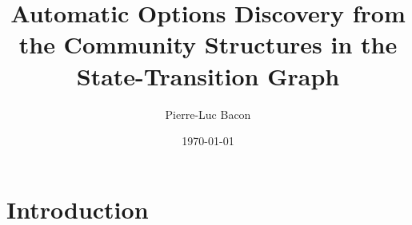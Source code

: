\documentclass[12pt, oneside, extrafontsizes]{memoir}  %
\theoremstyle{plain}
\theoremstyle{definition}
\begin{document}

\pretitle{\begin{center}\cftchapterfont\huge}
\posttitle{\end{center}}
\preauthor{\begin{center}\huge}
\postauthor{\end{center}}
\predate{\begin{center}\large}
\postdate{\end{center}}

\title{Automatic Options Discovery from the Community Structures in the State-Transition Graph}

\author{Pierre-Luc Bacon}
\date{\today}
\renewcommand\maketitlehookb{
\vfill
}
\renewcommand\maketitlehookc{
\vfill
\begin{center}
{
\large
Computer Science\\
McGill University, Montreal
}
\end{center}
\vspace{10mm}
}
\renewcommand\maketitlehookd{
\vspace{10mm}
A thesis submitted to McGill University in partial fulfilment of the requirements of
the degree of Master of Science.
\copyright Pierre-Luc Bacon; \today.
}

\begin{titlingpage}
\maketitle
\end{titlingpage}

\setcounter{tocdepth}{2}
\tableofcontents

\chapter{Introduction}
\end{document}
